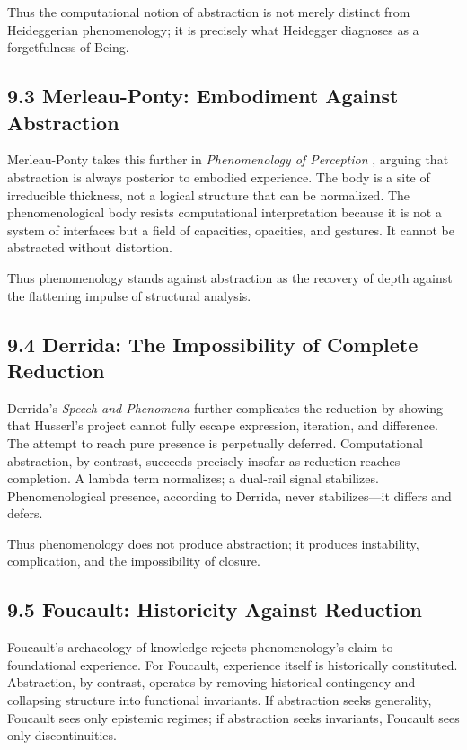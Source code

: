 \documentclass[12pt,letterpaper]{article}
\theoremstyle{remark}
\begin{document}
Thus the computational notion of abstraction is not merely distinct from Heideggerian phenomenology; it is precisely what Heidegger diagnoses as a forgetfulness of Being.

\subsection{9.3 Merleau-Ponty: Embodiment Against Abstraction}
Merleau-Ponty takes this further in \textit{Phenomenology of Perception} \citep{MerleauPonty1945}, arguing that abstraction is always posterior to embodied experience. The body is a site of irreducible thickness, not a logical structure that can be normalized. The phenomenological body resists computational interpretation because it is not a system of interfaces but a field of capacities, opacities, and gestures. It cannot be abstracted without distortion.

Thus phenomenology stands against abstraction as the recovery of depth against the flattening impulse of structural analysis.

\subsection{9.4 Derrida: The Impossibility of Complete Reduction}
Derrida’s \textit{Speech and Phenomena} \citep{Derrida1967} further complicates the reduction by showing that Husserl’s project cannot fully escape expression, iteration, and difference. The attempt to reach pure presence is perpetually deferred. Computational abstraction, by contrast, succeeds precisely insofar as reduction reaches completion. A lambda term normalizes; a dual-rail signal stabilizes. Phenomenological presence, according to Derrida, never stabilizes—it differs and defers.

Thus phenomenology does not produce abstraction; it produces instability, complication, and the impossibility of closure.

\subsection{9.5 Foucault: Historicity Against Reduction}
Foucault’s archaeology of knowledge \citep{Foucault1970} rejects phenomenology’s claim to foundational experience. For Foucault, experience itself is historically constituted. Abstraction, by contrast, operates by removing historical contingency and collapsing structure into functional invariants. If abstraction seeks generality, Foucault sees only epistemic regimes; if abstraction seeks invariants, Foucault sees only discontinuities.
\end{document}
